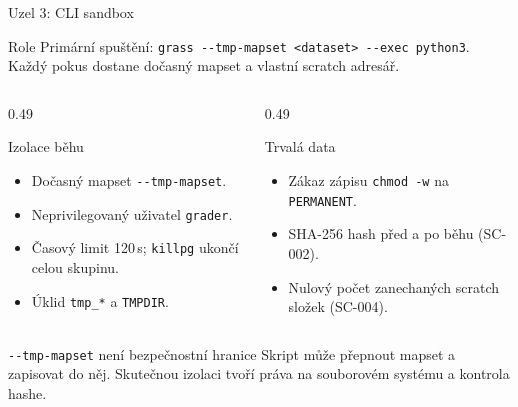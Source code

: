 \documentclass[aspectratio=169,11pt]{beamer}
\begin{document}
\begin{frame}[t]{Uzel 3: CLI sandbox}
  \small
  \begin{block}{Role}
    Primární spuštění:
    \texttt{grass -{}-tmp-mapset \textless dataset\textgreater{} -{}-exec python3}.
    Každý pokus dostane dočasný mapset a vlastní scratch adresář.
  \end{block}

  \begin{columns}[T,onlytextwidth]
    \begin{column}{0.49\textwidth}
      \begin{block}{Izolace běhu}
        \begin{itemize}
          \item Dočasný mapset \texttt{-{}-tmp-mapset}.
          \item Neprivilegovaný uživatel \texttt{grader}.
          \item Časový limit 120\,s; \texttt{killpg} ukončí celou skupinu.
          \item Úklid \texttt{tmp\_*} a \texttt{TMPDIR}.
        \end{itemize}
      \end{block}
    \end{column}
    \begin{column}{0.49\textwidth}
      \begin{block}{Trvalá data}
        \begin{itemize}
          \item Zákaz zápisu \texttt{chmod -w} na \texttt{PERMANENT}.
          \item SHA-256 hash před a po běhu (SC-002).
          \item Nulový počet zanechaných scratch složek (SC-004).
        \end{itemize}
      \end{block}
    \end{column}
  \end{columns}

  \begin{alertblock}{\texttt{-{}-tmp-mapset} není bezpečnostní hranice}
    Skript může přepnout mapset a zapisovat do něj. Skutečnou izolaci tvoří
    práva na souborovém systému a kontrola hashe.
  \end{alertblock}
\end{frame}
\end{document}

